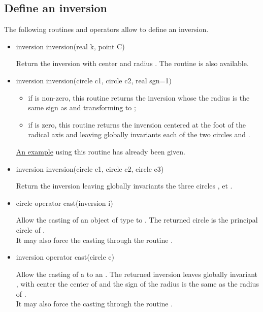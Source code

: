 \documentclass[pdftex]{article}
\begin{document}
\subsection{Define an inversion}
The following routines and operators allow to define an inversion.
\begin{itemize}
\item {}
  \begin{Vcolor}
    inversion inversion(real k, point C)
  \end{Vcolor}
  Return the inversion with center  and radius . The
  routine  is also available.
\item {}
  \begin{Vcolor}
    inversion inversion(circle c1, circle c2, real sgn=1)
  \end{Vcolor}
  \begin{itemize}
  \item if  is non-zero, this routine returns the inversion
    whose the radius is the same sign as  and transforming
     to ;
  \item if  is zero, this routine returns the inversion
    centered at the foot of the radical axis and leaving globally
    invariants each of the two circles  and .
  \end{itemize}
  \href{#exemple_inversion}{An example} using this routine has already been given.
\item {}
  \begin{Vcolor}
    inversion inversion(circle c1, circle c2, circle c3)
  \end{Vcolor}
  Return the inversion leaving globally invariants the three circles
  ,  et .
\item {}
  \begin{Vcolor}
    circle operator cast(inversion i)
  \end{Vcolor}
  Allow the casting of an object of type  to
  . The returned circle is the principal circle
  of .\\
  It may also force the casting through the routine
  .
\item {}
  \begin{Vcolor}
    inversion operator cast(circle c)
  \end{Vcolor}
  Allow the casting of a  to an .
  The returned inversion leaves globally invariant , with
  center the center of  and the sign of the radius is the
  same as the radius of .\\
  It may also force the casting through the routine
  .

\end{itemize}
\end{document}
